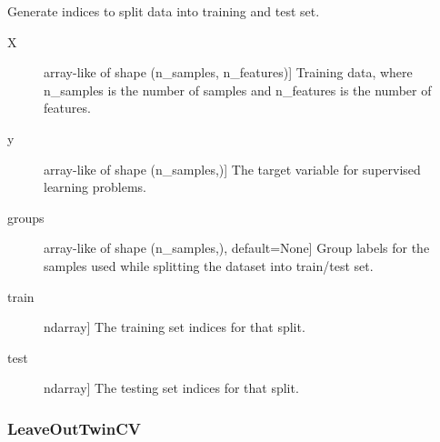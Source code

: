 \documentclass[letterpaper,10pt,english]{sphinxmanual}
\begin{document}
\begin{fulllineitems}
\begin{fulllineitems}
\end{fulllineitems}


\begin{fulllineitems}
\label{\detokenize{api/mastml.data_splitters.LeaveOutPercent:mastml.data_splitters.LeaveOutPercent.split}}
Generate indices to split data into training and test set.
\begin{description}
\item[{X}] \leavevmode{[}array-like of shape (n\_samples, n\_features){]}
Training data, where n\_samples is the number of samples
and n\_features is the number of features.

\item[{y}] \leavevmode{[}array-like of shape (n\_samples,){]}
The target variable for supervised learning problems.

\item[{groups}] \leavevmode{[}array-like of shape (n\_samples,), default=None{]}
Group labels for the samples used while splitting the dataset into
train/test set.

\end{description}
\begin{description}
\item[{train}] \leavevmode{[}ndarray{]}
The training set indices for that split.

\item[{test}] \leavevmode{[}ndarray{]}
The testing set indices for that split.

\end{description}

\end{fulllineitems}


\end{fulllineitems}



\subsubsection{LeaveOutTwinCV}
\label{\detokenize{api/mastml.data_splitters.LeaveOutTwinCV:leaveouttwincv}}\label{\detokenize{api/mastml.data_splitters.LeaveOutTwinCV::doc}}
\end{document}
